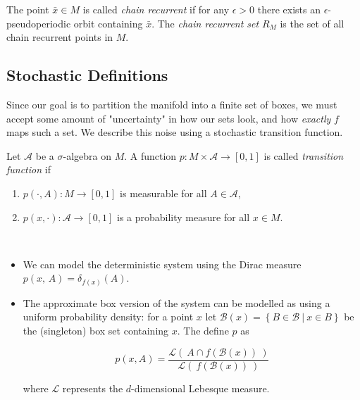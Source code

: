 \begin{definition}
    \cite*{dynbook} The point $\bar{x} \in M$ is called \emph{chain recurrent} if for any 
    $\epsilon > 0$ there exists an $\epsilon$-pseudoperiodic orbit containing $\bar{x}$. 
    The \emph{chain recurrent set} $R_M$ is the set of all chain recurrent points in $M$.
\end{definition}


\subsection{Stochastic Definitions}

Since our goal is to partition the manifold into a finite set of boxes, we must accept some
amount of "uncertainty" in how our sets look, and how \emph{exactly} $f$ maps such a set.
We describe this noise using a stochastic transition function. 

\begin{definition}
    \cite*{attr} Let $\mathcal{A}$ be a $\sigma$-algebra on $M$. A function 
    $p : M \times \mathcal{A} \to [0,1]$ is called \emph{transition function} if

    \begin{enumerate}
        \item $p(\cdot, A) : M \to [0,1]$ is measurable for all $A \in \mathcal{A}$,
        \item $p(x, \cdot) : \mathcal{A} \to [0,1]$ is a probability measure for all $x \in M$.
    \end{enumerate}

\end{definition}

\begin{example}\
    
    \begin{itemize}
        \item\label{ex:q} \cite*{attr} We can model the deterministic system using the Dirac 
        measure $p(x,\, A) = \delta_{f(x)}(A)$. 
        \item The approximate box version of the system can be modelled as using a uniform 
        probability density: for a point $x$ let 
        $\mathcal{B}(x) = \left\{ B \in \mathcal{B}\ \vert\ x \in B \right\}$ be the 
        (singleton) box set containing $x$. The define $p$ as 

        \begin{equation}
            p(x, A) = \frac{
                \mathcal{L} (\ A \cap f(\mathcal{B}(x))\ )
            }{
                \mathcal{L} (\ f(\mathcal{B}(x))\ )
            }
        \end{equation}

        where $\mathcal{L}$ represents the $d$-dimensional Lebesque measure.
    
    \end{itemize}

\end{example}

